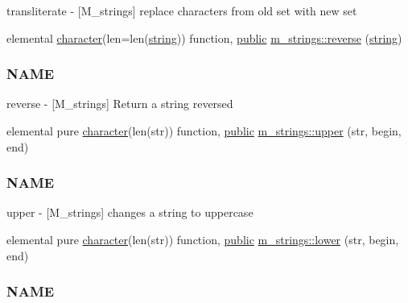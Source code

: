 \begin{DoxyCompactItemize}
\begin{DoxyCompactList}
transliterate -\/ \mbox{[}M\+\_\+strings\mbox{]} replace characters from old set with new set \end{DoxyCompactList}\item 
elemental \hyperlink{option__stopwatch_83_8txt_abd4b21fbbd175834027b5224bfe97e66}{character}(len=len(\hyperlink{what__overview_81_8txt_a74cb7e955273b9f9157b4f0c18a38849}{string})) function, \hyperlink{M__stopwatch_83_8txt_a2f74811300c361e53b430611a7d1769f}{public} \hyperlink{namespacem__strings_ab3e5e7af9e9594fdb544f82736a26f17}{m\+\_\+strings\+::reverse} (\hyperlink{what__overview_81_8txt_a74cb7e955273b9f9157b4f0c18a38849}{string})
\begin{DoxyCompactList}\small\item\em \subsubsection*{N\+A\+ME}

reverse -\/ \mbox{[}M\+\_\+strings\mbox{]} Return a string reversed \end{DoxyCompactList}\item 
elemental pure \hyperlink{option__stopwatch_83_8txt_abd4b21fbbd175834027b5224bfe97e66}{character}(len(str)) function, \hyperlink{M__stopwatch_83_8txt_a2f74811300c361e53b430611a7d1769f}{public} \hyperlink{namespacem__strings_a0953ac5c4d31339fdd8ec3acc9c3c915}{m\+\_\+strings\+::upper} (str, begin, end)
\begin{DoxyCompactList}\small\item\em \subsubsection*{N\+A\+ME}

upper -\/ \mbox{[}M\+\_\+strings\mbox{]} changes a string to uppercase \end{DoxyCompactList}\item 
elemental pure \hyperlink{option__stopwatch_83_8txt_abd4b21fbbd175834027b5224bfe97e66}{character}(len(str)) function, \hyperlink{M__stopwatch_83_8txt_a2f74811300c361e53b430611a7d1769f}{public} \hyperlink{namespacem__strings_a3c7d4be9051206e4b2f72112f9fdc3b4}{m\+\_\+strings\+::lower} (str, begin, end)
\begin{DoxyCompactList}\small\item\em \subsubsection*{N\+A\+ME}


\end{DoxyCompactList}
\end{DoxyCompactItemize}
